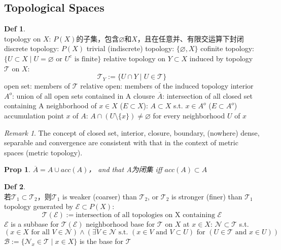\documentclass[hidelinks]{article}
\theoremstyle{definition}
\newtheorem*{defin}{Def}
\theoremstyle{plain}
\newtheorem{proposition}[theorem]{Prop}
\theoremstyle{remark}
\newtheorem*{remark}{Remark}
\begin{document}
\subsection{Topological Spaces}
\begin{defin}~\\
topology on $X$: $P(X)$的子集，包含$\varnothing$和$X$，且在任意并、有限交运算下封闭 \newline
\indent discrete topology: $P(X)$ \newline
\indent trivial (indiscrete) topology: $\{\varnothing,X\}$ \newline
\indent cofinite topology: $\{U\subset X\mid U=\varnothing \textrm{ or } U^c \textrm{ is finite}\}$ \newline
relative topology on $Y\subset X$ induced by topology $\mathscr{T}$ on $X$:
$$\mathscr{T}_Y:=\{U\cap Y\mid U\in \mathscr{T}\}$$
open set: members of $\mathscr{T}$ \newline
relative open: members of the induced topology \newline
interior $A^o$: union of all open sets contained in A\newline
clousre $\overline{A}$: intersection of all closed set containing A\newline
neighborhood of $x\in X$ ($E\subset X$): $A\subset X$ s.t. $x\in A^o$ ($E\subset A^o$) \newline
accumulation point $x$ of $A$: $A\cap (U\setminus\{x\})\neq \varnothing$ for every neighborhood $U$ of $x$
\end{defin}

\begin{remark}
The concept of closed set, interior, closure, boundary, (nowhere) dense, separable and convergence are consistent with that in the context of metric spaces (metric topology).
\end{remark}

\begin{proposition}
$\overline{A}=A\cup acc(A)$， and that A为闭集 \textrm{iff} $acc(A)\subset A$
\end{proposition}

\begin{defin}~\\
若$\mathscr{T}_1\subset\mathscr{T}_2$，则$\mathscr{T}_1$ is weaker (coarser) than $\mathscr{T}_2$, or $\mathscr{T}_2$ is stronger (finer) than $\mathscr{T}_1$ \newline
topology generated by $\mathscr{E}\subset P(X)$:
$$\mathscr{T}(\mathscr{E}):= \textrm{intersection of all topologies on X containing }\mathscr{E}$$
$\mathscr{E}$ is a subbase for $\mathscr{T}(\mathscr{E})$ \newline
neighborhood base for $\mathscr{T}$ on $X$ at $x\in X$: $\mathscr{N}\subset \mathscr{T}$ s.t.
$$(x\in X \textrm{ for all } V\in \mathscr{N})\wedge(\exists V\in \mathscr{N} \textrm{ s.t. }(x\in V \textrm{ and } V\subset U)\textrm{ for }(U\in \mathscr{T} \textrm{ and } x\in U))$$
$\mathscr{B}:=\{\mathscr{N}_x\in \mathscr{T}\mid x\in X\}$ is the base for $\mathscr{T}$
\end{defin}
\end{document}
